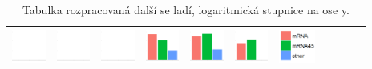 \begin{table}
{\begin{tabular}{ | p{} | c  c  c  c | c  c  c  c  c | c | }
\includegraphics[height=1.1cm]{images/graph_08_inf_04.png} &
\includegraphics[height=1.1cm]{images/graph_08_inf_05.png} &
\includegraphics[height=1.1cm]{images/graph_08_inf_06.png} &
\includegraphics[height=1.1cm]{images/graph_08_inf_07.png} &
\includegraphics[height=1.1cm]{images/graph_08_inf_08.png} &
\includegraphics[height=1.1cm]{images/graph_08_inf_09.png} &
\includegraphics[height=1.1cm]{images/graph_06_legend.png}
\\
 \hline
\end{tabular}
}
\caption{Tabulka rozpracovaná další se ladí, logaritmická stupnice na ose y.}
\end{table}